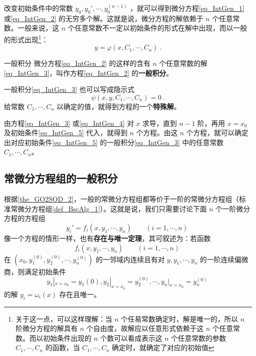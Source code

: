 改变初始条件中的常数 $y_0,y_0',\cdots,y_0^{(n-1)}$ ，就可以得到微分方程\autoref{eq_IntGen_1} 或\autoref{eq_IntGen_2} 的无穷多个解。这就是说，微分方程的解依赖于 $n$ 个任意常数。一般来说，这 $n$ 个任意常数不一定以初始条件的形式在解中出现，而以一般的形式出现\footnote{关于这一点，可以这样理解：当 $n$ 个任易常数确定时，解是唯一的，所以 $n$ 阶微分方程的解具有 $n$ 个自由度，故解应以任意形式依赖于这 $n$ 个任意常数。而以初始条件出现的 $n$ 个数可以看成表示这 $n$ 个任意常数的参数 $C_1,\cdots,C_n$ 的函数，当 $C_1,\cdots,C_n$ 确定时，就确定了对应的初始值}：
\begin{equation}\label{eq_IntGen_3}
y=\varphi(x,C_1,\cdots,C_n)~.
\end{equation}
\begin{definition}{一般积分}
微分方程\autoref{eq_IntGen_2} 的这样的含有 $n$ 个任意常数的解\autoref{eq_IntGen_3}，叫作方程\autoref{eq_IntGen_2} 的\textbf{一般积分}。
\end{definition}
一般积分\autoref{eq_IntGen_3} 也可以写成隐示式
\begin{equation}\label{eq_IntGen_4}
\psi(x,y,C_1,\cdots,C_n)=0~.
\end{equation}
给常数 $C_1,\cdots,C_n$ 以确定的值，就得到方程的一个\textbf{特殊解}。

由方程\autoref{eq_IntGen_3} 或\autoref{eq_IntGen_4} 对 $x$ 求导，直到 $n-1$ 阶，再用 $x=x_0$ 及初始条件\autoref{eq_IntGen_5} 代入，就得到 $n$ 个方程。由这 $n$ 个方程，就可以确定出对应初始条件\autoref{eq_IntGen_5} 的一般积分\autoref{eq_IntGen_3} 中的任意常数 $C_1,\cdots,C_n$。
\subsection{常微分方程组的一般积分}
根据\autoref{the_GO2SOD_2}，一般的常微分方程组都等价于一阶的常微分方程组（标准常微分方程组\autoref{def_BscAlg_1}）。这就是说，我们只需要讨论下面 $n$ 个一阶微分方程的方程组
\begin{equation}\label{eq_IntGen_6}
y_i'=f_i(x,y_1,\cdots,y_n)\qquad (i=1,\cdots,n)~
\end{equation}
像一个方程的情形一样，也有\textbf{存在与唯一定理}，其可叙述为：若函数
\begin{equation}
f_i(x,y_1,\cdots,y_n)\qquad (i=1,\cdots,n)~
\end{equation}
在 $(x_0,y_1^{(0)},y_2^{(0)},\cdots,y_n^{(0)})$ 的一邻域内连续且有对 $y,y_1,\cdots,y_n$ 的一阶连续偏微商，则满足初始条件
\begin{equation}\label{eq_IntGen_8}
y_1|_{x=x_0}=y_1{(0)},y_2|_{x=x_0}=y_2^{(0)},\cdots,y_n|_{x=x_0}=y_n^{(0)}~
\end{equation}
的解 $y_i=\omega_i(x)$ 存在且唯一。

